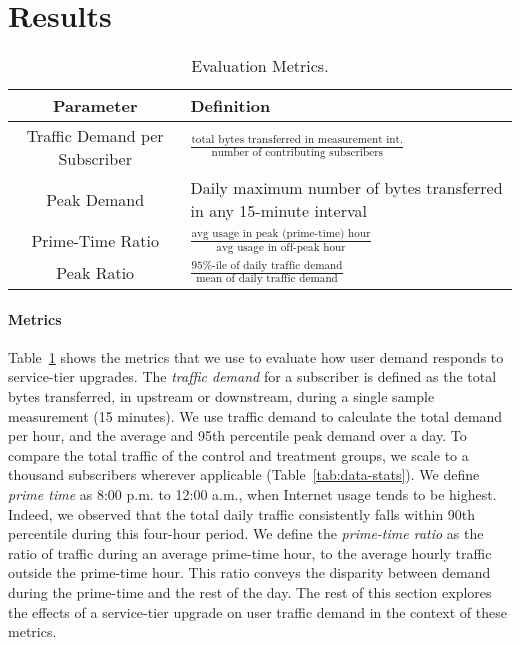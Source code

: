 \section{Results}\label{sec:analysis}

\begin{table}[t]
\begin{small}
\begin{tabular}{| c | p{1.6in} |}\hline
\textbf{Parameter} & \textbf{Definition}	\\\hline
Traffic Demand per Subscriber& \(\frac{\text{total bytes transferred in 
measurement int.}}{\text{number of contributing subscribers}}\)	\\
Peak Demand & Daily maximum number of bytes transferred in any 15-minute
interval \\ 
Prime-Time Ratio 	& \( \frac{ \text{avg usage in peak (prime-time) 
hour}}{ \text{avg usage in off-peak hour}}\) 		\\
Peak Ratio 		& \(\frac{\text{95\%-ile of daily traffic 
demand}}{\text{mean of daily traffic demand}}\)	\\\hline
\end{tabular}
\end{small}
\caption{Evaluation Metrics.}
\label{tab:eval-criteria}
\end{table}

\paragraph{Metrics}
Table~\ref{tab:eval-criteria} shows the metrics that we use to evaluate
how user demand responds to service-tier upgrades. The \emph{traffic
  demand} for a subscriber is defined as the total bytes transferred, in
upstream or downstream, during a single sample measurement (15 minutes).
We use traffic demand to calculate the total demand per hour, and the
average and 95th percentile peak demand over a day. To compare the total
traffic of the control and treatment groups, we scale to a thousand
subscribers wherever applicable (Table~\ref{tab:data-stats}).  We
define \emph{prime time} as 8:00 p.m. to 12:00 a.m., when Internet usage
tends to be highest.  Indeed, we
observed that the total daily traffic consistently falls within 90th percentile
during this four-hour period. We define the \emph{prime-time ratio} as
the ratio of traffic during an average prime-time hour, to the average
hourly traffic outside the prime-time hour.  This ratio conveys the
disparity between demand during the prime-time and the rest of the day.
The rest of this section explores the effects of a service-tier upgrade
on user traffic demand in the context of these metrics.









%